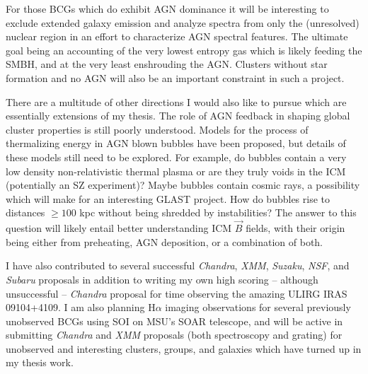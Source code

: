 \documentclass[11pt]{article}
\begin{document}
For those BCGs which do exhibit AGN dominance it will be
interesting to exclude extended galaxy emission and analyze spectra
from only the (unresolved) nuclear region in an effort to characterize
AGN spectral features. The ultimate goal being an accounting of the
very lowest entropy gas which is likely feeding the SMBH, and at the
very least enshrouding the AGN. Clusters without star formation and
no AGN will also be an important constraint in such a project.

There are a multitude of other directions I would also like to pursue
which are essentially extensions of my thesis. The role of AGN
feedback in shaping global cluster properties is still poorly
understood. Models for the process of thermalizing energy in AGN blown bubbles
have been proposed, but details of these models still need to be explored.
For example, do bubbles contain a very low density non-relativistic
thermal plasma or are they truly voids in the ICM (potentially an SZ
experiment)? Maybe bubbles contain cosmic rays, a possibility which
will make for an interesting GLAST project. How do bubbles rise to
distances $\geq 100$ kpc without being shredded by instabilities? The
answer to this question will likely entail better understanding ICM
$\vec{B}$ fields, with their origin being either from preheating, AGN
deposition, or a combination of both.

I have also contributed to several successful {\it Chandra},
{\it XMM}, {\it Suzaku}, {\it NSF}, and {\it Subaru}
proposals in addition to writing my own high scoring -- although
unsuccessful -- {\it Chandra} proposal for time observing the amazing
ULIRG IRAS 09104+4109. I am also planning H$\alpha$ imaging
observations for several previously unobserved BCGs using SOI on MSU's
SOAR telescope, and will be active in submitting {\it Chandra} and
{\it XMM} proposals (both spectroscopy and grating) for unobserved and
interesting clusters, groups, and galaxies which have turned up in my
thesis work.
\end{document}
